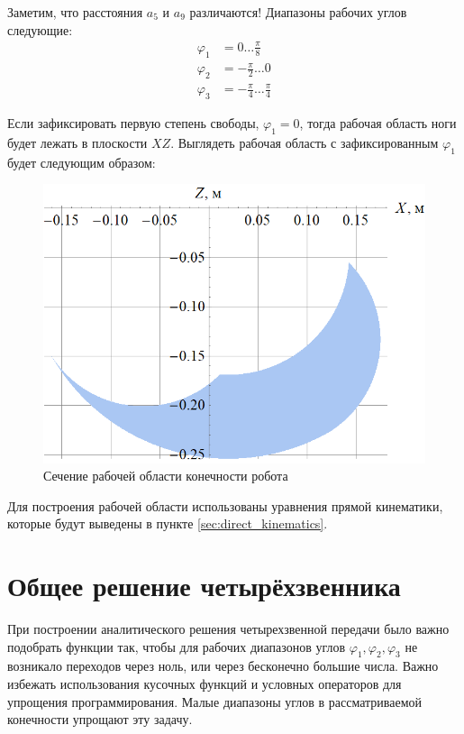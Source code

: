 Заметим, что расстояния $ a_5 $ и $ a_9 $ различаются! Диапазоны рабочих углов следующие:
\begin{align*}
    \varphi_1&=0 \dots \frac \pi 8 \\
    \varphi_2&=-\frac \pi 2 \dots 0 \\
    \varphi_3&=-\frac \pi 4 \dots \frac \pi 4
\end{align*}

Если зафиксировать первую степень свободы, $ \varphi_1 = 0 $, тогда рабочая область ноги будет лежать в плоскости $ XZ $. Выглядеть рабочая область с зафиксированным $ \varphi_1 $ будет следующим образом:
\begin{figure}[h]
    \centering
    \includegraphics[scale=0.5]{chapter_kinematics/figure3.png}
    \caption{Сечение рабочей области конечности робота}
    \label{}
\end{figure}

Для построения рабочей области использованы уравнения прямой кинематики, которые будут выведены в пункте \ref{sec:direct_kinematics}.

\section{Общее решение четырёхзвенника}

При построении аналитического решения четырехзвенной передачи было важно подобрать функции так, чтобы для рабочих диапазонов углов $ \varphi_1, \varphi_2, \varphi_3 $ не возникало переходов через ноль, или через бесконечно большие числа. Важно избежать использования кусочных функций и условных операторов для упрощения программирования.
Малые диапазоны углов в рассматриваемой конечности упрощают эту задачу.

